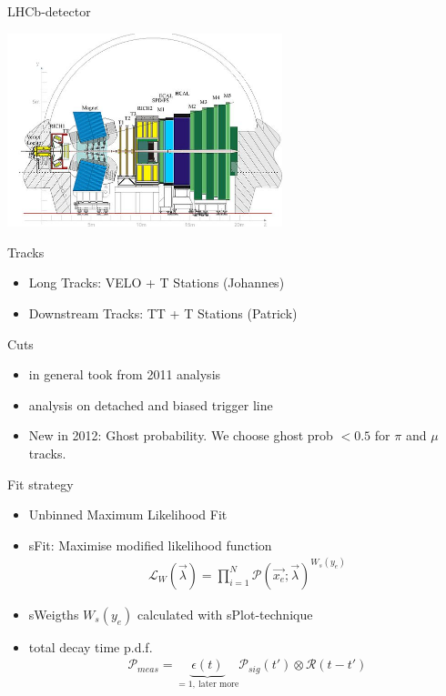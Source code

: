 \documentclass{beamer}
\begin{document}
	\begin{frame}{LHCb-detector}
	\begin{center}
	\includegraphics[width = 0.6\textwidth]{detector}
	\end{center}
	\begin{block}{Tracks}
	\begin{itemize}
		\item Long Tracks: VELO + T Stations (Johannes)
		\item Downstream Tracks: TT + T Stations (Patrick)
	\end{itemize}
	\end{block}	
	\end{frame}
	
	
	\begin{frame}{Cuts}
    \begin{itemize}
    \item in general took from 2011 analysis
    \item analysis on detached and biased trigger line
	\item New in 2012: Ghost probability. We choose ghost prob $<0.5$ for $\pi$ and $\mu$ tracks.
	\end{itemize}
	\end{frame}
	
	\begin{frame}{Fit strategy}
	\begin{itemize}
	\item Unbinned Maximum Likelihood Fit
	\item sFit: Maximise modified likelihood function
	\begin{align}
	\mathcal{L}_W(\vec{\lambda}) = \prod_{i=1}^N \mathcal{P}(\vec{x_e};\vec{\lambda})^{W_s(y_e)}
	\end{align}
	\item sWeigths $W_s(y_e)$ calculated with sPlot-technique
	\item total decay time p.d.f.
	\begin{align}
	\mathcal{P}_{meas} = \underbrace{\epsilon(t)}_{= 1,\ \text{later more}}\mathcal{P}_{sig}(t') \otimes \mathcal{R}(t-t')
	\end{align}
	\end{itemize}
	\end{frame}
	
\end{document}
